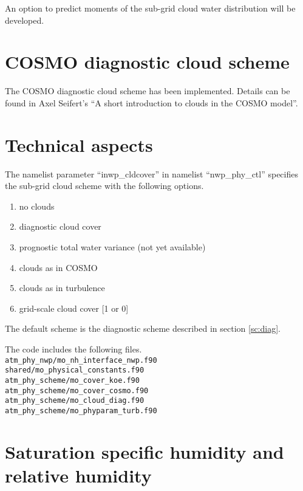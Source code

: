 An option to predict moments of the sub-grid cloud water distribution will be
developed.  



\section{COSMO diagnostic cloud scheme}

The COSMO diagnostic cloud scheme has been implemented.  Details can be found in 
Axel Seifert's ``A short introduction to clouds in the COSMO model''.

\section{Technical aspects}

The namelist parameter ``inwp\_cldcover''
in namelist ``nwp\_phy\_ctl'' specifies the sub-grid cloud scheme with the following options.
\begin{enumerate}[start=0]
\item no clouds
\item diagnostic cloud cover
\item prognostic total water variance (not yet available)
\item clouds as in COSMO
\item clouds as in turbulence
\item grid-scale cloud cover [1 or 0]
\end{enumerate}
The default scheme is the diagnostic scheme described in section \ref{sc:diag}.

The code includes the following files.\\
\verb|atm_phy_nwp/mo_nh_interface_nwp.f90 |\\
\verb|shared/mo_physical_constants.f90    |\\
\verb|atm_phy_scheme/mo_cover_koe.f90     |\\
\verb|atm_phy_scheme/mo_cover_cosmo.f90   |\\
\verb|atm_phy_scheme/mo_cloud_diag.f90    |\\
\verb|atm_phy_scheme/mo_phyparam_turb.f90 |\\



\section{Saturation specific humidity and relative humidity}

